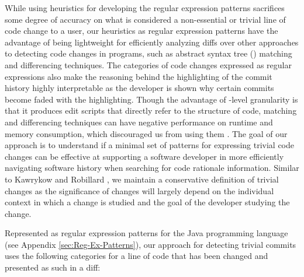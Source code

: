While using heuristics for developing the regular expression patterns sacrifices some degree of accuracy on what is considered a non-essential or trivial line of code change to a user,
our heuristics as regular expression patterns have the advantage of being lightweight for efficiently analyzing diffs over other approaches to detecting code changes in programs, such as abstract syntax tree () matching and differencing techniques.
The categories of code changes expressed as regular expressions also make the reasoning behind the highlighting of the commit history highly interpretable as the developer is shown why certain commits become faded with the highlighting.
Though the advantage of -level granularity is that it produces edit scripts that directly refer to the structure of code, 
 matching and differencing techniques can have negative performance on runtime and memory consumption, 
which discouraged us from using them \cite{fluri_change_2007,pawlik_RTED_2011,falleri_fine-grained_2014}.
The goal of our approach is to understand if a minimal set of patterns for 
expressing trivial code changes can be effective at supporting a software developer in more efficiently navigating 
software history when searching for code rationale information.
Similar to Kawrykow and Robillard \cite{kawrykow_non-essential_2011}, 
we maintain a conservative definition of trivial changes as the significance of changes will largely 
depend on the individual context in which a change is studied and
the goal of the developer studying the change.

Represented as regular expression patterns for the Java programming language (see Appendix \ref{sec:Reg-Ex-Patterns}), 
our approach for detecting trivial commits uses the following categories for a line of code 
that has been changed and presented as such in a diff: 


